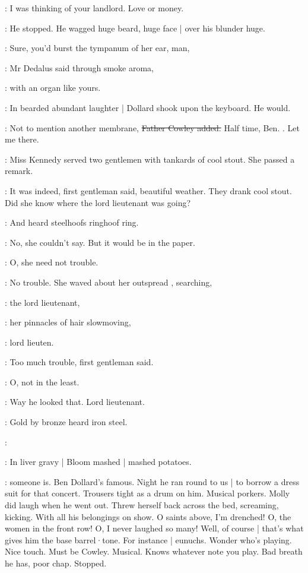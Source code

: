\dollard:
I was thinking of your landlord.
Love or money.

:
He stopped.
He wagged huge beard,
huge face |
over his blunder huge.

\simon:
Sure,
you'd burst the tympanum of her ear,
man,

:
Mr Dedalus said through smoke aroma,

\simon:
with an organ like yours.

:
In bearded abundant laughter |
Dollard shook upon the keyboard.
He would.

\cowley:
Not to mention another membrane,
\sout{Father Cowley added.}
Half time, Ben.
.
Let me there.

:
Miss Kennedy served two gentlemen with tankards of cool stout.
She passed a remark.

:
It was indeed,
first gentleman said,
beautiful weather.
They drank cool stout.
Did she know where the lord lieutenant was going?

:
And heard steelhoofs ringhoof ring.

:
No,
she couldn't say.
But it would be in the paper.

:
O, she need not trouble.

:
No trouble.
She waved about her outspread ,
searching,

\MissKInt:
the lord lieutenant,

:
her pinnacles of hair slowmoving,

\MissKInt:
lord lieuten.

:
Too much trouble,
first gentleman said.

:
O, not in the least.

\MissKInt:
Way he looked that.
Lord lieutenant.

:
Gold by bronze
heard iron steel.%

\dollard:

:
In liver gravy |
Bloom mashed |
mashed potatoes.

\BloomInt:
 someone is.
Ben Dollard's famous.
Night he ran round to us |
to borrow a dress suit for that concert.
Trousers tight as a drum on him.
Musical porkers.
Molly did laugh when he went out.
Threw herself back across the bed,
screaming,
kicking.
With all his belongings on show.
O saints above,
I'm drenched!
O, the women in the front row!
O, I never laughed so many!
Well,
of course |
that's what gives him the base barrel·tone.
For instance |
eunuchs.
Wonder who's playing.
Nice touch.
Must be Cowley.
Musical.
Knows whatever note you play.
Bad breath he has,
poor chap.
Stopped.

